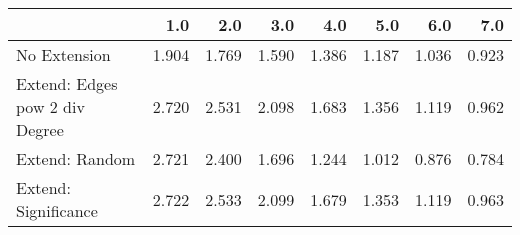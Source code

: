\begin{tabular}{lrrrrrrr}
\toprule
{} &   1.0 &   2.0 &   3.0 &   4.0 &   5.0 &   6.0 &   7.0 \\
\midrule
No Extension                   & 1.904 & 1.769 & 1.590 & 1.386 & 1.187 & 1.036 & 0.923 \\
Extend: Edges pow 2 div Degree & 2.720 & 2.531 & 2.098 & 1.683 & 1.356 & 1.119 & 0.962 \\
Extend: Random                 & 2.721 & 2.400 & 1.696 & 1.244 & 1.012 & 0.876 & 0.784 \\
Extend: Significance           & 2.722 & 2.533 & 2.099 & 1.679 & 1.353 & 1.119 & 0.963 \\
\bottomrule
\end{tabular}
